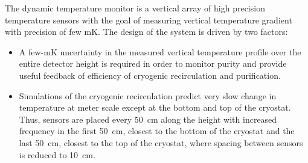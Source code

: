 The dynamic temperature monitor is a vertical array of high precision temperature sensors with the goal of measuring vertical temperature gradient with precision of few \si{mK}. The design of the system is driven by two factors:
\begin{itemize}
\item
A few-\si{mK} uncertainty in the measured vertical temperature profile over the entire detector height is required in order to monitor \lar purity and provide useful feedback of efficiency of cryogenic recirculation and purification.
\item
Simulations of the cryogenic recirculation predict very slow change in temperature at meter scale except at the bottom and top of the cryostat. Thus, sensors are placed every \SI{50}{cm} along the  height with increased frequency in the first \SI{50}{cm}, closest to the bottom of the cryostat and the last \SI{50}{cm}, closest to the top of the cryostat, where spacing between sensors is reduced to \SI{10}{cm}.
 \end{itemize}



